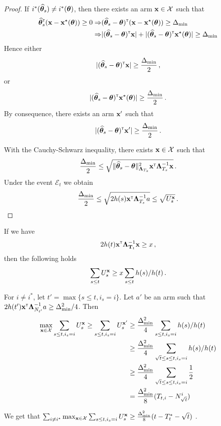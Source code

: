 \begin{proof}
If $i^*(\widehat{{\boldsymbol \theta}}_s) \neq i^*({\boldsymbol \theta})$, then there exists an arm ${\bf x}\in\mathcal{X}$ such that
\begin{align*}
\widehat{{\boldsymbol \theta}}_s^\mathsf{\scriptscriptstyle T}({\bf x} - {\bf x}^\star({\boldsymbol \theta})) \ge 0
\Rightarrow & (\widehat{{\boldsymbol \theta}}_s - {\boldsymbol \theta})^\mathsf{\scriptscriptstyle T} ({\bf x} - {\bf x}^\star({\boldsymbol \theta})) \ge \Delta_{\min}
\\
\Rightarrow & | (\widehat{{\boldsymbol \theta}}_s - {\boldsymbol \theta})^\mathsf{\scriptscriptstyle T} {\bf x} | + | (\widehat{{\boldsymbol \theta}}_s - {\boldsymbol \theta})^\mathsf{\scriptscriptstyle T} {\bf x}^\star({\boldsymbol \theta}) | \ge \Delta_{\min}
\end{align*}
Hence either 
\[
    | (\widehat{{\boldsymbol \theta}}_s - {\boldsymbol \theta})^\mathsf{\scriptscriptstyle T} {\bf x} | \ge \frac{\Delta_{\min}}{2}\,,
\]
or
\[
    | (\widehat{{\boldsymbol \theta}}_s - {\boldsymbol \theta})^\mathsf{\scriptscriptstyle T} {\bf x}^\star({\boldsymbol \theta}) | \ge \frac{\Delta_{\min}}{2}\,.
\]
By consequence, there exists an arm ${\bf x}'$ such that 
\[
    | (\widehat{{\boldsymbol \theta}}_s - {\boldsymbol \theta})^\mathsf{\scriptscriptstyle T} {\bf x}' | \ge \frac{\Delta_{\min}}{2}\,.
\]

With the Cauchy-Schwarz inequality, there exists ${\bf x}\in\mathcal{X}$ such that
\[
    \frac{\Delta_{\min}}{2} \le \sqrt{\Vert \widehat{{\boldsymbol \theta}}_s - {\boldsymbol \theta} \Vert^2_{{\boldsymbol \Lambda}_{T_s}} {\bf x}^\mathsf{\scriptscriptstyle T} {\boldsymbol \Lambda}_{T_s}^{-1}{\bf x}}\,.
\]
Under the event $\mathcal E_t$ we obtain 
\[
    \frac{\Delta_{\min}}{2} \le \sqrt{2 h(s) {\bf x}^\mathsf{\scriptscriptstyle T} {\boldsymbol \Lambda}_{T_s}^{-1}a} \le \sqrt{U_s^{\bf x}}\,.
\]
\end{proof}

\begin{lemma}
If we have 
\[
    2h(t){\bf x}^\mathsf{\scriptscriptstyle T}{\boldsymbol \Lambda}_{{\bf T}_t}^{-1}{\bf x} \ge x\,,
\]
then the following holds
\[
    \sum_{s\le t} U_s^{\bf x} \ge x \sum_{s\le t} h(s)/h(t)\,.
\]
\end{lemma}

For $i\neq i^*$, let $t'= \max\{s\le t, i_s = i\}$. Let $a'$ be an arm such that $2h(t'){\bf x}^\mathsf{\scriptscriptstyle T} {\boldsymbol \Lambda}_{N_{t'}}^{-1}a \ge \Delta_{\min}^2/4$. Then
\begin{align*}
\max_{{\bf x}\in \mathcal{X}}\sum_{s\le t, i_s=i} U_s^{\bf x}
\ge \sum_{s\le t, i_s=i} U_s^{{\bf x}'}
&\ge \frac{\Delta_{\min}^2}{4} \sum_{s\le t, i_s=i} h(s)/h(t)
\\
&\ge \frac{\Delta_{\min}^2}{4} \sum_{\sqrt{t} \le s\le t, i_s=i} h(s)/h(t)
\\
&\ge \frac{\Delta_{\min}^2}{4} \sum_{\sqrt{t} \le s\le t, i_s=i} \frac{1}{2}
\\
&= \frac{\Delta_{\min}^2}{8} (T_{t,i} - N_{\sqrt{t}}^i)
\end{align*}

We get that $\sum_{i\neq i^*}\max_{{\bf x}\in \mathcal{X}}\sum_{s\le t, i_s=i} U_s^{\bf x} \ge \frac{\Delta_{\min}^2}{8} (t - T_t^* - \sqrt{t})$ .

